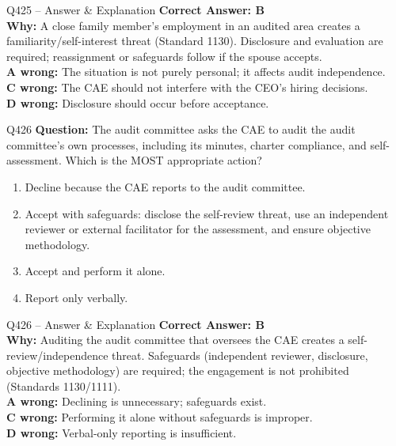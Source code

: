 \documentclass[aspectratio=169,10pt]{beamer}
\begin{document}
	\begin{frame}[t]{Q425 -- Answer \& Explanation}
		\small
		\textbf{Correct Answer: B} \\[4pt]
		\textbf{Why:} A close family member's employment in an audited area creates a familiarity/self-interest threat (Standard 1130). Disclosure and evaluation are required; reassignment or safeguards follow if the spouse accepts. \\[4pt]
		\textbf{A wrong:} The situation is not purely personal; it affects audit independence. \\[2pt]
		\textbf{C wrong:} The CAE should not interfere with the CEO's hiring decisions. \\[2pt]
		\textbf{D wrong:} Disclosure should occur before acceptance.
	\end{frame}
	
	\begin{frame}[t]{Q426}
		\small
		\textbf{Question:} The audit committee asks the CAE to audit the audit committee's own processes, including its minutes, charter compliance, and self-assessment. Which is the MOST appropriate action?
		\begin{enumerate}[label=\Alph*.,itemsep=1pt,topsep=2pt]
			\item Decline because the CAE reports to the audit committee.
			\item Accept with safeguards: disclose the self-review threat, use an independent reviewer or external facilitator for the assessment, and ensure objective methodology.
			\item Accept and perform it alone.
			\item Report only verbally.
		\end{enumerate}
	\end{frame}
	
	\begin{frame}[t]{Q426 -- Answer \& Explanation}
		\small
		\textbf{Correct Answer: B} \\[4pt]
		\textbf{Why:} Auditing the audit committee that oversees the CAE creates a self-review/independence threat. Safeguards (independent reviewer, disclosure, objective methodology) are required; the engagement is not prohibited (Standards 1130/1111). \\[4pt]
		\textbf{A wrong:} Declining is unnecessary; safeguards exist. \\[2pt]
		\textbf{C wrong:} Performing it alone without safeguards is improper. \\[2pt]
		\textbf{D wrong:} Verbal-only reporting is insufficient.
	\end{frame}
	
\end{document}
